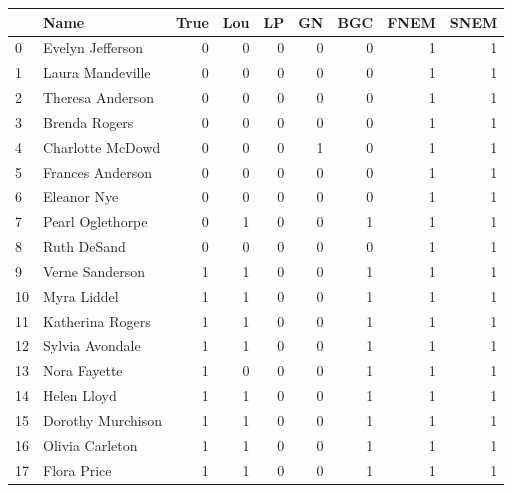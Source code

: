 \begin{tabular}{llrrrrrrr}
\toprule
 & Name & True & Lou & LP & GN & BGC & FNEM & SNEM \\
\midrule
0 & Evelyn Jefferson & 0 & 0 & 0 & 0 & 0 & 1 & 1 \\
1 & Laura Mandeville & 0 & 0 & 0 & 0 & 0 & 1 & 1 \\
2 & Theresa Anderson & 0 & 0 & 0 & 0 & 0 & 1 & 1 \\
3 & Brenda Rogers & 0 & 0 & 0 & 0 & 0 & 1 & 1 \\
4 & Charlotte McDowd & 0 & 0 & 0 & 1 & 0 & 1 & 1 \\
5 & Frances Anderson & 0 & 0 & 0 & 0 & 0 & 1 & 1 \\
6 & Eleanor Nye & 0 & 0 & 0 & 0 & 0 & 1 & 1 \\
7 & Pearl Oglethorpe & 0 & 1 & 0 & 0 & 1 & 1 & 1 \\
8 & Ruth DeSand & 0 & 0 & 0 & 0 & 0 & 1 & 1 \\
9 & Verne Sanderson & 1 & 1 & 0 & 0 & 1 & 1 & 1 \\
10 & Myra Liddel & 1 & 1 & 0 & 0 & 1 & 1 & 1 \\
11 & Katherina Rogers & 1 & 1 & 0 & 0 & 1 & 1 & 1 \\
12 & Sylvia Avondale & 1 & 1 & 0 & 0 & 1 & 1 & 1 \\
13 & Nora Fayette & 1 & 0 & 0 & 0 & 1 & 1 & 1 \\
14 & Helen Lloyd & 1 & 1 & 0 & 0 & 1 & 1 & 1 \\
15 & Dorothy Murchison & 1 & 1 & 0 & 0 & 1 & 1 & 1 \\
16 & Olivia Carleton & 1 & 1 & 0 & 0 & 1 & 1 & 1 \\
17 & Flora Price & 1 & 1 & 0 & 0 & 1 & 1 & 1 \\
\bottomrule
\end{tabular}
